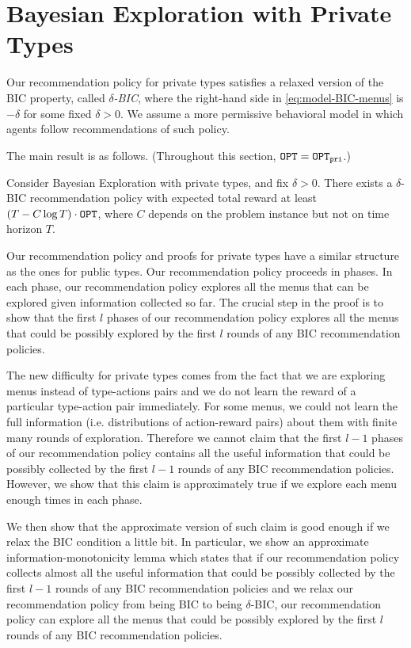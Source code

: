 
\section{Bayesian Exploration with Private Types}
\label{sec:private_nc}

Our recommendation policy for private types satisfies a relaxed version of the BIC property, called \emph{$\delta$-BIC}, where the right-hand side in \eqref{eq:model-BIC-menus} is $-\delta$ for some fixed $\delta>0$. We assume a more permissive behavioral model in which agents follow recommendations of such policy.

The main result is as follows. (Throughout this section, $\mathtt{OPT} = \mathtt{OPT}_{\mathtt{pri}}$.)


\begin{theorem}
\label{thm:private_nocc}
Consider Bayesian Exploration with private types, and fix $\delta > 0$. There exists a $\delta$-BIC recommendation policy with expected total reward at least $\left(T - C \log T \right) \cdot \mathtt{OPT}$, where $C$ depends on the problem instance but not on time horizon $T$.
\end{theorem}

Our recommendation policy and proofs for private types have a similar structure as the ones for public types. Our recommendation policy proceeds in phases. In each phase, our recommendation policy explores all the menus that can be explored given information collected so far. The crucial step in the proof is to show that the first $l$ phases of our recommendation policy explores all the menus that could be possibly explored by the first $l$ rounds of any BIC recommendation policies.

The new difficulty for private types comes from the fact that we are exploring menus instead of type-actions pairs and we do not learn the reward of a particular type-action pair immediately. For some menus, we could not learn the full information (i.e. distributions of action-reward pairs) about them with finite many rounds of exploration. Therefore we cannot claim that the first $l-1$ phases of our recommendation policy contains all the useful information that could be possibly collected by the first $l-1$ rounds of any BIC recommendation policies. However, we show that this claim is approximately true if we explore each menu enough times in each phase.

We then show that the approximate version of such claim is good enough if we relax the BIC condition a little bit. In particular, we show an approximate information-monotonicity lemma which states that if our recommendation policy collects almost all the useful information that could be possibly collected by the first $l-1$ rounds of any BIC recommendation policies and we relax our recommendation policy from being BIC to being $\delta$-BIC, our recommendation policy can explore all the menus that could be possibly explored by the first $l$ rounds of any BIC recommendation policies.


